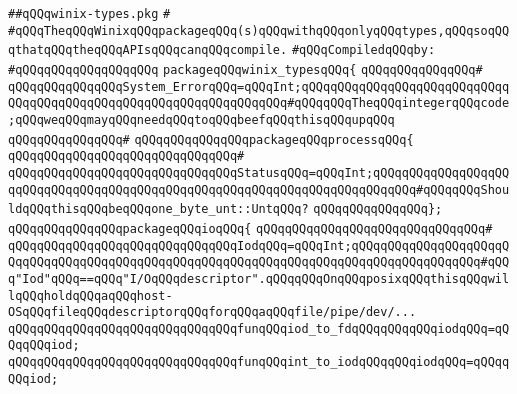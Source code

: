 \label{src/lib/std/src/posix/winix-types.pkg}
\verb|##qQQqwinix-types.pkg|\newline
\verb|#|\newline
\verb|#qQQqTheqQQqWinixqQQqpackageqQQq(s)qQQqwithqQQqonlyqQQqtypes,qQQqsoqQQqthatqQQqtheqQQqAPIsqQQqcanqQQqcompile.|\newline
\newline
\verb|#qQQqCompiledqQQqby:|\newline
\verb|#qQQqqQQqqQQqqQQqqQQq|\newline
\newline
\newline
\verb|packageqQQqwinix_typesqQQq{|\newline
\verb|qQQqqQQqqQQqqQQq#|\newline
\verb|qQQqqQQqqQQqqQQqSystem_ErrorqQQq=qQQqInt;qQQqqQQqqQQqqQQqqQQqqQQqqQQqqQQqqQQqqQQqqQQqqQQqqQQqqQQqqQQqqQQqqQQq#qQQqqQQqTheqQQqintegerqQQqcode;qQQqweqQQqmayqQQqneedqQQqtoqQQqbeefqQQqthisqQQqupqQQq|\newline
\verb|qQQqqQQqqQQqqQQq#|\newline
\verb|qQQqqQQqqQQqqQQqpackageqQQqprocessqQQq{|\newline
\verb|qQQqqQQqqQQqqQQqqQQqqQQqqQQqqQQq#|\newline
\verb|qQQqqQQqqQQqqQQqqQQqqQQqqQQqqQQqStatusqQQq=qQQqInt;qQQqqQQqqQQqqQQqqQQqqQQqqQQqqQQqqQQqqQQqqQQqqQQqqQQqqQQqqQQqqQQqqQQqqQQqqQQq#qQQqqQQqShouldqQQqthisqQQqbeqQQqone_byte_unt::UntqQQq?|\newline
\verb|qQQqqQQqqQQqqQQq};|\newline
\newline
\verb|qQQqqQQqqQQqqQQqpackageqQQqioqQQq{|\newline
\verb|qQQqqQQqqQQqqQQqqQQqqQQqqQQqqQQq#|\newline
\verb|qQQqqQQqqQQqqQQqqQQqqQQqqQQqqQQqIodqQQq=qQQqInt;qQQqqQQqqQQqqQQqqQQqqQQqqQQqqQQqqQQqqQQqqQQqqQQqqQQqqQQqqQQqqQQqqQQqqQQqqQQqqQQqqQQqqQQq#qQQq"Iod"qQQq==qQQq"I/OqQQqdescriptor".qQQqqQQqOnqQQqposixqQQqthisqQQqwillqQQqholdqQQqaqQQqhost-OSqQQqfileqQQqdescriptorqQQqforqQQqaqQQqfile/pipe/dev/...|\newline
\newline
\verb|qQQqqQQqqQQqqQQqqQQqqQQqqQQqqQQqfunqQQqiod_to_fdqQQqqQQqqQQqiodqQQq=qQQqqQQqiod;|\newline
\verb|qQQqqQQqqQQqqQQqqQQqqQQqqQQqqQQqfunqQQqint_to_iodqQQqqQQqiodqQQq=qQQqqQQqiod;|\newline
